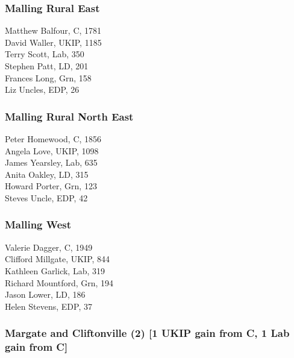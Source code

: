 \documentclass[a4paper,openany,10pt]{book}
\begin{document}
\subsubsection*{Malling Rural East}



Matthew Balfour, C, 1781\\
David Waller, UKIP, 1185\\
Terry Scott, Lab, 350\\
Stephen Patt, LD, 201\\
Frances Long, Grn, 158\\
Liz Uncles, EDP, 26\\


\subsubsection*{Malling Rural North East}



Peter Homewood, C, 1856\\
Angela Love, UKIP, 1098\\
James Yearsley, Lab, 635\\
Anita Oakley, LD, 315\\
Howard Porter, Grn, 123\\
Steves Uncle, EDP, 42\\


\subsubsection*{Malling West}



Valerie Dagger, C, 1949\\
Clifford Millgate, UKIP, 844\\
Kathleen Garlick, Lab, 319\\
Richard Mountford, Grn, 194\\
Jason Lower, LD, 186\\
Helen Stevens, EDP, 37\\


\subsubsection*{Margate and Cliftonville (2) \hspace*{\fill}\nolinebreak[1]%
\enspace\hspace*{\fill}
[1 UKIP gain from C, 1 Lab gain from C]}
\end{document}
